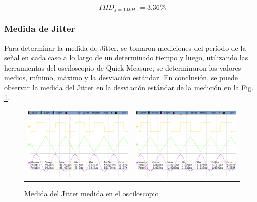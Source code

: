 \begin{equation}
    THD_{f = 10kHz} = 3.36 \%
\end{equation}

\subsubsection{Medida de Jitter}
Para determinar la medida de Jitter, se tomaron mediciones del per\'iodo de la se\~nal en cada caso a lo largo de un determinado
tiempo y luego, utilizando las herramientas del osciloscopio de Quick Measure, se determinaron los valores medios, m\'inimo, m\'aximo y
la desviaci\'on est\'andar. En conclusi\'on, se puede observar la medida del Jitter en la desviaci\'on est\'andar de la medici\'on en la Fig. \ref{fig:medida_jitter}.

\begin{figure}[H]
    \centering
    \begin{tabular}{c c}
        \includegraphics[scale=0.2]{../EJ3/Mediciones/Actuales/Osciloscopio/Jitter/cropped_scope_19.png} &
        \includegraphics[scale=0.2]{../EJ3/Mediciones/Actuales/Osciloscopio/Jitter/cropped_scope_20.png}
    \end{tabular}    
    \caption{Medida del Jitter medida en el osciloscopio}
    \label{fig:medida_jitter}
\end{figure}

